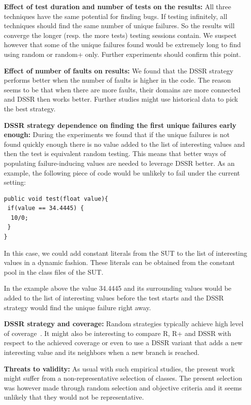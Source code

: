 \documentclass{acm_proc_article-sp}
\begin{document}
\textbf{Effect of test duration and number of tests on the results:}
All three techniques have the same potential for finding bugs. If testing infinitely, all techniques should find the same number of unique failures.
So the results will converge the longer (resp. the more tests) testing sessions contain. We suspect however that some of the unique failures found would be extremely long to find using random or random+ only. Further experiments should confirm this point.


\textbf{Effect of number of faults on results:} 
We found that the DSSR strategy performs better when the number of faults is higher in the code. The reason seems to be that when there are more faults, their domains are more connected and DSSR then works better. Further studies might use historical data to pick the best strategy.

\textbf{DSSR strategy dependence on finding the first unique failures early enough:}
During the experiments we found that if the unique failures is not found  quickly enough there is no value added to the list of interesting values and then the test is equivalent random testing. This means that better ways of populating failure-inducing values are needed to leverage DSSR better. As an example, the following piece of code would be unlikely to fail under the current setting:

\begin{lstlisting}
public void test(float value){
 if(value == 34.4445) { 
  10/0; 
 }
}
\end{lstlisting}

In this case, we could add constant literals from the SUT to the list of interesting values in a dynamic fashion. These literals can be obtained from the constant pool in the class files of the SUT.

In the example above the value 34.4445 and its surrounding values would  be added to the list of interesting values before the test starts and the DSSR strategy would find the unique failure right away.

\textbf{DSSR strategy and coverage:} Random strategies typically achieve high level of coverage~\cite{Oriol2010}. It might also be interesting to compare R, R+ and DSSR with respect to the achieved coverage or even to use a DSSR variant that adds a new interesting value and its neighbors when a new branch is reached.


\textbf{Threats to validity:} As usual with such empirical studies, the present work might suffer from a non-representative selection of classes.
The present selection was however made through random selection and objective criteria and it seems unlikely that they would not be representative.
\end{document}
